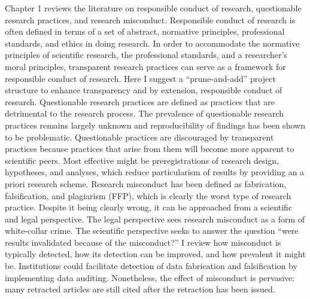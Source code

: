 \documentclass[a5paper]{book}
\begin{document}
Chapter 1 reviews the literature on responsible conduct of research,
questionable research practices, and research misconduct. Responsible
conduct of research is often defined in terms of a set of abstract,
normative principles, professional standards, and ethics in doing
research. In order to accommodate the normative principles of scientific
research, the professional standards, and a researcher's moral
principles, transparent research practices can serve as a framework for
responsible conduct of research. Here I suggest a
\enquote{prune-and-add} project structure to enhance transparency and by
extension, responsible conduct of research. Questionable research
practices are defined as practices that are detrimental to the research
process. The prevalence of questionable research practices remains
largely unknown and reproducibility of findings has been shown to be
problematic. Questionable practices are discouraged by transparent
practices because practices that arise from them will become more
apparent to scientific peers. Most effective might be preregistrations
of research design, hypotheses, and analyses, which reduce particularism
of results by providing an a priori research scheme. Research misconduct
has been defined as fabrication, falsification, and plagiarism (FFP),
which is clearly the worst type of research practice. Despite it being
clearly wrong, it can be approached from a scientific and legal
perspective. The legal perspective sees research misconduct as a form of
white-collar crime. The scientific perspective seeks to answer the
question \enquote{were results invalidated because of the misconduct?} I
review how misconduct is typically detected, how its detection can be
improved, and how prevalent it might be. Institutions could facilitate
detection of data fabrication and falsification by implementing data
auditing. Nonetheless, the effect of misconduct is pervasive: many
retracted articles are still cited after the retraction has been issued.
\end{document}
